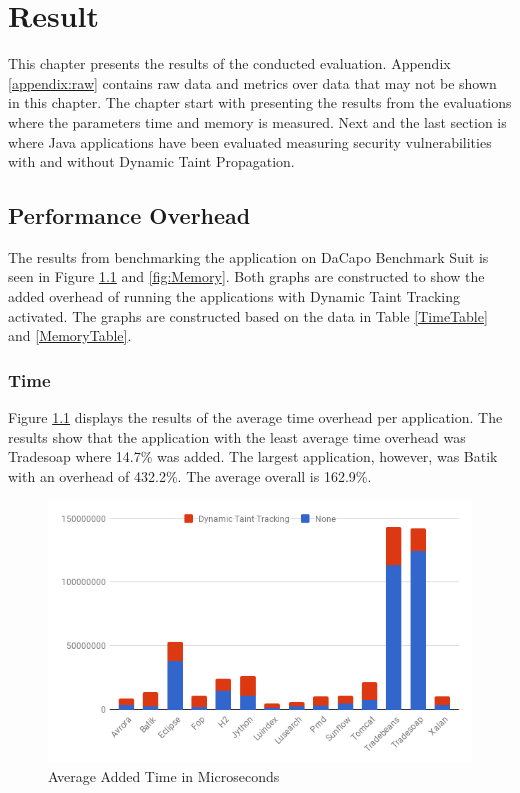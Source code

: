 \chapter{Result}
This chapter presents the results of the conducted evaluation. Appendix \ref{appendix:raw} contains raw data and metrics over data that may not be shown in this chapter. The chapter start with presenting the results from the \textit{} evaluations where the parameters time and memory is measured. Next and the last section is \textit{} where Java applications have been evaluated measuring security vulnerabilities with and without Dynamic Taint Propagation.



\section{Performance Overhead}
\label{Performance}
The results from benchmarking the application on DaCapo Benchmark Suit \parencite{dacapo} is seen in Figure \ref{fig:Time} and \ref{fig:Memory}. Both graphs are constructed to show the added overhead of running the applications with Dynamic Taint Tracking activated. The graphs are constructed based on the data in Table \ref{TimeTable} and \ref{MemoryTable}.



\subsection{Time}
Figure \ref{fig:Time} displays the results of the average time overhead per application. The results show that the application with the least average time overhead was Tradesoap where 14.7\% was added. The largest application, however, was Batik with an overhead of 432.2\%. The average overall is 162.9\%.

\begin{figure}[!hbt]
    \centering
    \includegraphics[width=\textwidth]{images/Time.png}
    \caption{Average Added Time in Microseconds}
    \label{fig:Time}
\end{figure}




